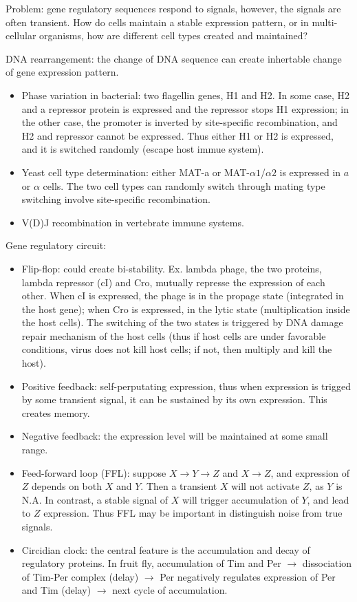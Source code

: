 \documentclass{report}
\begin{document}
Problem: gene regulatory sequences respond to signals, however, the signals are often transient. How do cells maintain a stable expression pattern, or in multi-cellular organisms, how are different cell types created and maintained? 

DNA rearrangement: the change of DNA sequence can create inhertable change of gene expression pattern. 
\begin{itemize}
	\item Phase variation in bacterial: two flagellin genes, H1 and H2. In some case, H2 and a repressor protein is expressed and the repressor stops H1 expression; in the other case, the promoter is inverted by site-specific recombination, and H2 and repressor cannot be expressed. Thus either H1 or H2 is expressed, and it is switched randomly (escape host immue system). 
	\item Yeast cell type determination: either MAT-a or MAT-$\alpha1$/$\alpha2$ is expressed in $a$ or $\alpha$ cells. The two cell types can randomly switch through mating type switching involve site-specific recombination. 
	\item V(D)J recombination in vertebrate immune systems. 
\end{itemize}

Gene regulatory circuit: 
\begin{itemize}
	\item Flip-flop: could create bi-stability. Ex. lambda phage, the two proteins, lambda repressor (cI) and Cro, mutually represse the expression of each other. When cI is expressed, the phage is in the propage state (integrated in the host gene); when Cro is expressed, in the lytic state (multiplication inside the host cells). The switching of the two states is triggered by DNA damage repair mechanism of the host cells (thus if host cells are under favorable conditions, virus does not kill host cells; if not, then multiply and kill the host). 
	\item Positive feedback: self-perputating expression, thus when expression is trigged by some transient signal, it can be sustained by its own expression. This creates memory. 
	\item Negative feedback: the expression level will be maintained at some small range. 
	\item Feed-forward loop (FFL): suppose $X \rightarrow Y \rightarrow Z$ and $X \rightarrow Z$, and expression of $Z$ depends on both $X$ and $Y$. Then a transient $X$ will not activate $Z$, as $Y$ is N.A. In contrast, a stable signal of $X$ will trigger accumulation of $Y$, and lead to $Z$ expression. Thus FFL may be important in distinguish noise from true signals. 
	\item Circidian clock: the central feature is the accumulation and decay of regulatory proteins. In fruit fly, accumulation of Tim and Per $\rightarrow$ dissociation of Tim-Per complex (delay) $\rightarrow$ Per negatively regulates expression of Per and Tim (delay) $\rightarrow$ next cycle of accumulation. 
\end{itemize}
\end{document}
